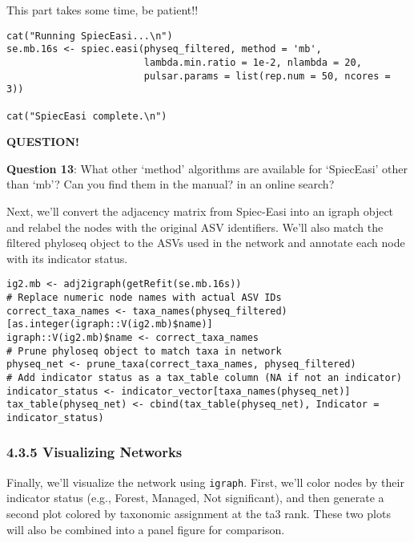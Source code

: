 \documentclass[
]{book}
\newenvironment{bluebox}{
  \definecolor{shadecolor}{RGB}{172, 210, 237}
  \color{white}
  \begin{shaded}}
 {\end{shaded}}
\begin{document}
This part takes some time, be patient!!

\begin{verbatim}
cat("Running SpiecEasi...\n")
se.mb.16s <- spiec.easi(physeq_filtered, method = 'mb',
                        lambda.min.ratio = 1e-2, nlambda = 20,
                        pulsar.params = list(rep.num = 50, ncores = 3))

cat("SpiecEasi complete.\n")
\end{verbatim}

\begin{bluebox}

\begin{center}
\textbf{QUESTION!}

\end{center}

\textbf{Question 13}: What other `method' algorithms are available for `SpiecEasi' other than `mb'? Can you find them in the manual? in an online search?

\end{bluebox}

Next, we'll convert the adjacency matrix from Spiec-Easi into an igraph object and relabel the nodes with the original ASV identifiers. We'll also match the filtered phyloseq object to the ASVs used in the network and annotate each node with its indicator status.

\begin{verbatim}
ig2.mb <- adj2igraph(getRefit(se.mb.16s))
# Replace numeric node names with actual ASV IDs
correct_taxa_names <- taxa_names(physeq_filtered)[as.integer(igraph::V(ig2.mb)$name)]
igraph::V(ig2.mb)$name <- correct_taxa_names
# Prune phyloseq object to match taxa in network
physeq_net <- prune_taxa(correct_taxa_names, physeq_filtered)
# Add indicator status as a tax_table column (NA if not an indicator)
indicator_status <- indicator_vector[taxa_names(physeq_net)]
tax_table(physeq_net) <- cbind(tax_table(physeq_net), Indicator = indicator_status)
\end{verbatim}

\subsubsection{4.3.5 Visualizing Networks}\label{visualizing-networks}

Finally, we'll visualize the network using \texttt{igraph}. First, we'll color nodes by their indicator status (e.g., Forest, Managed, Not significant), and then generate a second plot colored by taxonomic assignment at the ta3 rank. These two plots will also be combined into a panel figure for comparison.
\end{document}
